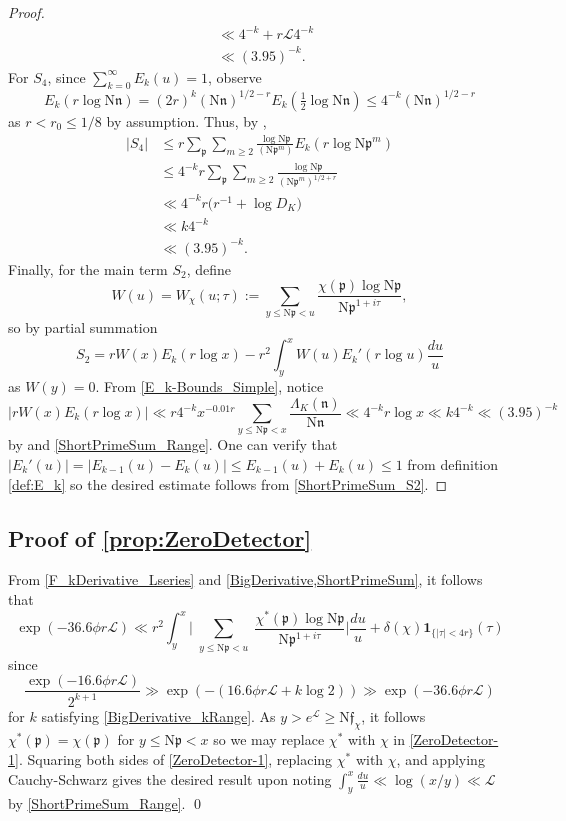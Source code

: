 \documentclass[12pt,psamsfonts]{amsart}
\theoremstyle{definition}
\theoremstyle{remark}
\numberwithin{equation}{section}
\theoremstyle{plain}
\theoremstyle{remark}
\renewcommand{\1}{ {\bf 1}}
\newcommand{\kf}{\mathfrak{f}}
\newcommand{\cL}{\mathcal{L}}
\newcommand{\kn}{\mathfrak{n}}
\newcommand{\N}{\mathrm{N}}
\newcommand{\kp}{\mathfrak{p}}
\begin{document}
\begin{proof}
\begin{equation*}
\begin{aligned}
& \ll 4^{-k} + r \cL 4^{-k} \\
& \ll (3.95)^{-k}. 
\end{aligned}
\end{equation*}
For $S_4$, since $\sum_{k=0}^{\infty} E_k(u) = 1$, observe
\[
E_k(r \log \N\kn) = (2r)^k (\N\kn)^{1/2-r} E_k(\tfrac{1}{2}\log \N\kn) \leq 4^{-k} (\N\kn)^{1/2-r}
\]
as $r < r_0 \leq 1/8$ by assumption. Thus, by \cite[Lemma 1.11]{Weiss}, 
\begin{align*}
|S_4| & \leq r \sum_{\kp} \sum_{m \geq 2} \frac{\log \N\kp}{(\N\kp^m)} E_k(r \log \N\kp^m) \\
& \leq 4^{-k} r \sum_{\kp} \sum_{m \geq 2} \frac{\log \N\kp}{(\N\kp^m)^{1/2+r} }  \\
& \ll 4^{-k} r \big( r^{-1} + \log D_K \big) \\
&  \ll  k 4^{-k} \\
& \ll (3.95)^{-k}.
\end{align*}
Finally, for the main term $S_2$, define
\[
W(u) = W_{\chi}(u; \tau) := \sum_{y \leq \N\kp < u} \frac{\chi(\kp) \log \N \kp  }{\N\kp^{1+i\tau}},
\]
so by partial summation
\begin{equation}
S_2    =  r W(x) E_k(r \log x) - r^2 \int_y^x  W(u) E_k'(r \log u) \frac{du}{u}
\label{ShortPrimeSum_S2}
\end{equation}
as $W(y) = 0$.  From \eqref{E_k-Bounds_Simple}, notice
\[
|r W(x) E_k(r \log x)| \ll r 4^{-k} x^{-0.01 r}  \sum_{y \leq \N\kp < x} \frac{\Lambda_K(\kn)}{\N\kn}  \ll 4^{-k}   r \log x \ll k 4^{-k} \ll (3.95)^{-k}
\]
by \cite[Lemma 1.11]{Weiss} and \eqref{ShortPrimeSum_Range}. One can  verify that $|E_k'(u)| = |E_{k-1}(u)  - E_k(u)| \leq E_{k-1}(u) + E_k(u) \leq 1$ from definition \eqref{def:E_k} so the desired estimate  follows from \eqref{ShortPrimeSum_S2}. 
\end{proof}

\subsection{Proof of \cref{prop:ZeroDetector}} \label{ZeroDetector_Proof}
 From  \eqref{F_kDerivative_Lseries} and \cref{BigDerivative,ShortPrimeSum}, it follows that 
\begin{equation}
\exp(-36.6 \phi r \cL)
\ll r^2 \int_y^x \Big| \sum_{\substack{y \leq \N\kp < u}} \frac{\chi^*(\kp) \log \N \kp  }{\N\kp^{1+i\tau}}  \Big| \frac{du}{u}  + \delta(\chi) \mathbf{1}_{\{|\tau| < 4r\}}(\tau)
\label{ZeroDetector-1}
\end{equation}
since
\[
\frac{ \exp(-16.6 \phi r \cL) }{2^{k+1}} \gg \exp( - (16.6 \phi r \cL + k \log 2) ) \gg \exp(-36.6 \phi r \cL) 
\]
for $k$ satisfying \eqref{BigDerivative_kRange}. As $y > e^{\cL} \geq \N\kf_{\chi}$, it follows $\chi^*(\kp) = \chi(\kp)$ for $y \leq \N\kp < x$ so we may replace $\chi^*$ with $\chi$ in \eqref{ZeroDetector-1}. Squaring both sides of \eqref{ZeroDetector-1}, replacing $\chi^*$ with $\chi$, and applying Cauchy-Schwarz gives the desired result upon noting $\int_y^x \frac{du}{u} \ll \log(x/y) \ll \cL$ by \eqref{ShortPrimeSum_Range}. 
\hfill \qed
 
\end{document}
